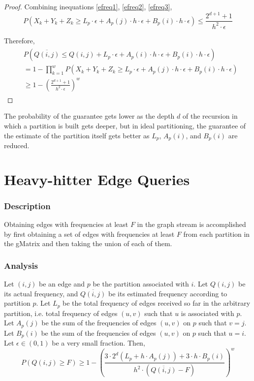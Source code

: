 \begin{proof}
Combining inequations \ref{efreq1}, \ref{efreq2}, \ref{efreq3},
\begin{equation} \label{efreq4}
  P(X_k + Y_k + Z_k \geq L_p \cdot \epsilon + A_p(j) \cdot h \cdot \epsilon + B_p(i) \cdot h \cdot \epsilon) \leq \frac{2^{d+1}+1}{h^2\cdot\epsilon}
\end{equation}

Therefore,
\begin{align}
\begin{split}
&  P(\overline{Q(i,j)} \leq Q(i,j) + L_p \cdot \epsilon + A_p(i) \cdot h \cdot \epsilon + B_p(i) \cdot h \cdot \epsilon)
\\  &= 1 - \prod _{k=1}^{w}P(X_k + Y_k + Z_k \geq L_p \cdot \epsilon + A_p(j) \cdot h \cdot \epsilon + B_p(i) \cdot h \cdot \epsilon)
\\  &\geq 1-(\frac{2^{d+1}+1}{h^2\cdot\epsilon})^w
\end{split}
\end{align}

\end{proof}

\begin{remarks}
  The probability of the guarantee gets lower as the depth $d$ of the recursion in which a partition is built gets deeper, but in ideal partitioning, the guarantee of the estimate of the partition itself gets better as $L_p$, $A_p(i)$, and $B_p(i)$ are reduced.
\end{remarks}


\section{Heavy-hitter Edge Queries}
\subsubsection{Description}
Obtaining edges with frequencies at least $F$ in the graph stream is accomplished by first obtaining a set of edges with frequencies at least $F$ from each partition in the gMatrix and then taking the union of each of them.

\subsubsection{Analysis}

\begin{theorem}
Let $(i,j)$ be an edge and $p$ be the partition associated with $i$. Let $Q(i,j)$ be its actual frequency, and $\overline{Q(i,j)}$ be its estimated frequency according to partition $p$. Let $L_p$ be the total frequency of edges received so far in the arbitrary partition, i.e. total frequency of edges $(u,v)$ such that $u$ is associated with $p$. Let $A_p(j)$ be the sum of the frequencies of edges $(u,v)$ on $p$ such that $v=j$. Let $B_p(i)$ be the sum of the frequencies of edges $(u,v)$ on $p$ such that $u=i$. Let $\epsilon \in (0,1)$ be a very small fraction. Then,
\[
P(Q(i,j) \geq F) \geq 1-(\frac{3\cdot2^d(L_p+h\cdot A_p(j)) + 3\cdot h\cdot B_p(i)}{h^2\cdot (\overline{Q(i,j)}-F)})^w
\]
\end{theorem}

